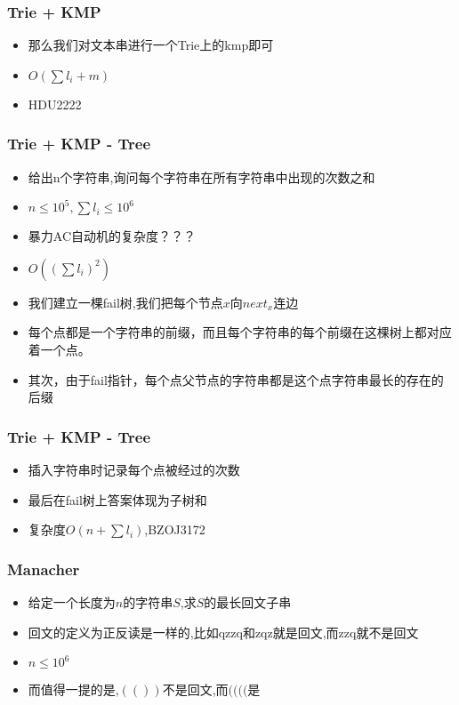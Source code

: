 \documentclass[notheorems]{beamer}
\begin{document}
\begin{frame}
\frametitle{Trie + KMP}
\begin{itemize}[]
\item 那么我们对文本串进行一个Trie上的kmp即可
\item $O(\sum l_i + m)$
\item HDU2222
\end{itemize}
\end{frame}

\begin{frame}
\frametitle{Trie + KMP - Tree}
\begin{itemize}[]
\item 给出n个字符串,询问每个字符串在所有字符串中出现的次数之和
\item $n\leq 10^5,\sum l_i \leq 10^6$
\pause
\item 暴力AC自动机的复杂度？？？
\pause
\item $O((\sum l_i)^2)$
\pause
\item 我们建立一棵fail树,我们把每个节点$x$向$next_x$连边
\pause
\item 每个点都是一个字符串的前缀，而且每个字符串的每个前缀在这棵树上都对应着一个点。
\item 其次，由于fail指针，每个点父节点的字符串都是这个点字符串最长的存在的后缀
\end{itemize}
\end{frame}


\begin{frame}
\frametitle{Trie + KMP - Tree}
\begin{itemize}[]
\item 插入字符串时记录每个点被经过的次数
\item 最后在fail树上答案体现为子树和
\item 复杂度$O(n+\sum l_i)$,BZOJ3172
\end{itemize}
\end{frame}

\begin{frame}
\frametitle{Manacher}
\begin{itemize}[]
\item 给定一个长度为$n$的字符串$S$,求$S$的最长回文子串
\item 回文的定义为正反读是一样的,比如qzzq和zqz就是回文,而zzq就不是回文
\item $n\leq 10^6$
\pause
\item 而值得一提的是,$(())$不是回文,而$(((($是
\end{itemize}
\end{frame}
\end{document}
